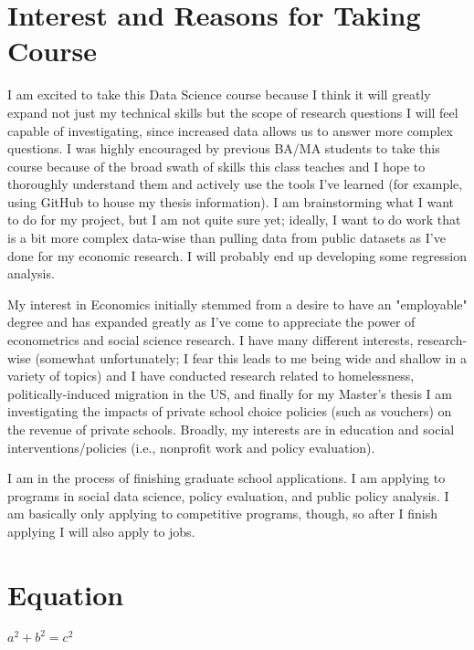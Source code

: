 \documentclass[12pt]{article}
\begin{document}
\section*{Interest and Reasons for Taking Course}
I am excited to take this Data Science course because I think it will greatly expand not just my technical skills but the scope of research questions I will feel capable of investigating, since increased data allows us to answer more complex questions. I was highly encouraged by previous BA/MA students to take this course because of the broad swath of skills this class teaches and I hope to thoroughly understand them and actively use the tools I've learned (for example, using GitHub to house my thesis information). I am brainstorming what I want to do for my project, but I am not quite sure yet; ideally, I want to do work that is a bit more complex data-wise than pulling data from public datasets as I've done for my economic research. I will probably end up developing some regression analysis. 

My interest in Economics initially stemmed from a desire to have an "employable" degree and has expanded greatly as I've come to appreciate the power of econometrics and social science research. I have many different interests, research-wise (somewhat unfortunately; I fear this leads to me being wide and shallow in a variety of topics) and I have conducted research related to homelessness, politically-induced migration in the US, and finally for my Master's thesis I am investigating the impacts of private school choice policies (such as vouchers) on the revenue of private schools. Broadly, my interests are in education and social interventions/policies (i.e., nonprofit work and policy evaluation). 

I am in the process of finishing graduate school applications. I am applying to programs in social data science, policy evaluation, and public policy analysis. I am basically only applying to competitive programs, though, so after I finish applying I will also apply to jobs. 

\section*{Equation}
$a^2 + b^2 = c^2$
\end{document}
